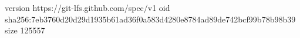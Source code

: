 version https://git-lfs.github.com/spec/v1
oid sha256:7eb3760d20d29d1935b61ad36f0a583d4280e8784ad89de742bcf99b78b98b39
size 125557
